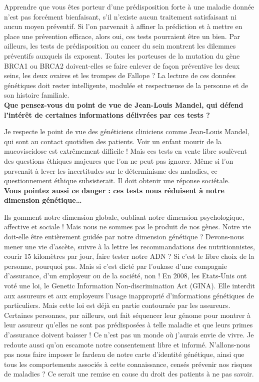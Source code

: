 \documentclass[8pt]{article}
\begin{document}
Apprendre que vous êtes porteur d’une prédisposition forte à une maladie donnée n’est pas forcément bienfaisant, s’il n’existe aucun traitement satisfaisant ni aucun moyen préventif. Si l’on parvenait à affiner la prédiction et à mettre en place une prévention efficace, alors oui, ces tests pourraient être un bien. Par ailleurs, les tests de prédisposition au cancer du sein montrent les dilemmes préventifs auxquels ils exposent. Toutes les porteuses de la mutation du gène BRCA1 ou BRCA2 doivent-elles se faire enlever de façon préventive les deux seins, les deux ovaires et les trompes de Fallope ? La lecture de ces données génétiques doit rester intelligente, modulée et respectueuse de la personne et de son histoire familiale. \\

\textbf{Que pensez-vous du point de vue de Jean-Louis Mandel, qui défend l’intérêt de certaines informations délivrées par ces tests ?}

Je respecte le point de vue des généticiens cliniciens comme Jean-Louis Mandel, qui sont au contact quotidien des patients. Voir un enfant mourir de la mucoviscidose est extrêmement difficile ! Mais ces tests en vente libre soulèvent des questions éthiques majeures que l’on ne peut pas ignorer. Même si l’on parvenait à lever les incertitudes sur le déterminisme des maladies, ce questionnement éthique subsisterait. Il doit obtenir une réponse sociétale. \\

\textbf{Vous pointez aussi ce danger : ces tests nous réduisent à notre dimension génétique…}

Ils gomment notre dimension globale, oubliant notre dimension psychologique, affective et sociale ! Mais nous ne sommes pas le produit de nos gènes. Notre vie doit-elle être entièrement guidée par notre dimension génétique ? Devons-nous mener une vie d’ascète, suivre à la lettre les recommandations des nutritionnistes, courir 15 kilomètres par jour, faire tester notre ADN ? Si c’est le libre choix de la personne, pourquoi pas. Mais si c’est dicté par l’oukase d’une compagnie d’assurance, d’un employeur ou de la société, non ! En 2008, les Etats-Unis ont voté une loi, le Genetic Information Non-discrimination Act (GINA). Elle interdit aux assureurs et aux employeurs l’usage inapproprié d’informations génétiques de particuliers. Mais cette loi est déjà en partie contournée par les assureurs. Certaines personnes, par ailleurs, ont fait séquencer leur génome pour montrer à leur assureur qu’elles ne sont pas prédisposées à telle maladie et que leurs primes d’assurance doivent baisser ! Ce n’est pas un monde où j’aurais envie de vivre. Je redoute aussi qu’on escamote notre consentement libre et informé. N’allons-nous pas nous faire imposer le fardeau de notre carte d’identité génétique, ainsi que tous les comportements associés à cette connaissance, censés prévenir nos risques de maladies ? Ce serait une remise en cause du droit des patients à ne pas savoir. \\
\end{document}
